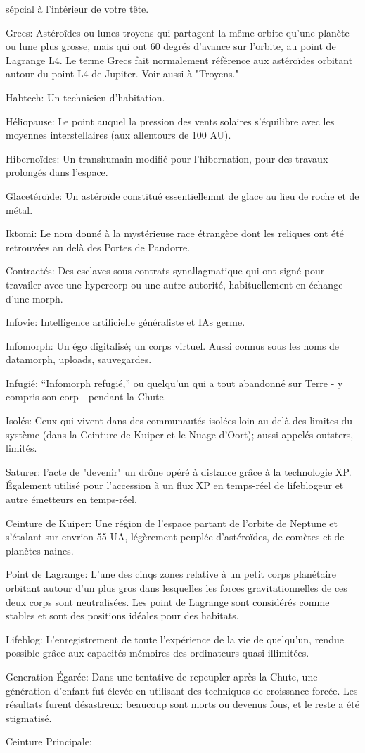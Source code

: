 sépcial à l'intérieur de votre tête. \item Grecs: Astéroîdes ou lunes troyens qui partagent la même orbite qu'une planète ou lune plus grosse, mais qui ont 60 degrés d'avance sur l'orbite, au point de Lagrange L4. Le terme Grecs fait normalement référence aux astéroïdes orbitant autour du point L4 de Jupiter. Voir aussi à "Troyens." \item Habtech: Un technicien d'habitation. \item Héliopause: Le point auquel la pression des vents solaires s'équilibre avec les moyennes interstellaires (aux allentours de 100 AU). \item Hibernoïdes: Un transhumain modifié pour l'hibernation, pour des travaux prolongés dans l'espace. \item Glacetéroïde: Un astéroïde constitué essentiellemnt de glace au lieu de roche et de métal. \item Iktomi: Le nom donné à la mystérieuse race étrangère dont les reliques ont été retrouvées au delà des Portes de Pandorre. \item Contractés: Des esclaves sous contrats synallagmatique qui ont signé pour travailer avec une hypercorp ou une autre autorité, habituellement en échange d'une morph. \item Infovie: Intelligence artificielle généraliste et IAs germe. \item Infomorph: Un égo digitalisé; un corps virtuel. Aussi connus sous les noms de datamorph, uploads, sauvegardes. \item Infugié: ``Infomorph refugié,'' ou quelqu'un qui a tout abandonné sur Terre - y compris son corp - pendant la Chute. \item Isolés: Ceux qui vivent dans des communautés isolées loin au-delà des limites du système (dans la Ceinture de Kuiper et le Nuage d'Oort); aussi appelés outsters, limités. \item Saturer: l'acte de "devenir" un drône opéré à distance grâce à la technologie XP. Également utilisé pour l'accession à un flux XP en temps-réel de lifeblogeur et autre émetteurs en temps-réel. \item Ceinture de Kuiper: Une région de l'espace partant de l'orbite de Neptune et s'étalant sur envrion 55 UA, légèrement peuplée d'astéroïdes, de comètes et de planètes naines. \item Point de Lagrange: L'une des cinqs zones relative à un petit corps planétaire orbitant autour d'un plus gros dans lesquelles les forces gravitationnelles de ces deux corps sont neutralisées. Les point de Lagrange sont considérés comme stables et sont des positions idéales pour des habitats. \item Lifeblog: L'enregistrement de toute l'expérience de la vie de quelqu'un, rendue possible grâce aux capacités mémoires des ordinateurs quasi-illimitées. \item Generation Égarée: Dans une tentative de repeupler après la Chute, une génération d'enfant fut élevée en utilisant des techniques de croissance forcée. Les résultats furent désastreux: beaucoup sont morts ou devenus fous, et le reste a été stigmatisé. \item Ceinture Principale: 